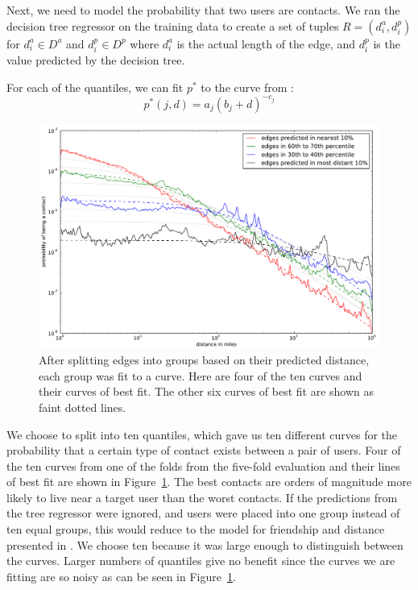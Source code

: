 \documentclass[letterpaper]{article}
\begin{document}
Next, we need to model the probability that two users are contacts. We ran the decision tree regressor on the training data to create a set of
tuples $R = (d^a_i, d^p_i)$ for $d^a_i \in D^a$ and $d^p_i \in D^p$ where $d^a_i$ is the actual length of the edge, and $d^p_i$ is the value predicted by the decision tree. 






For each of the quantiles, we can fit $p^*$ to the curve from \cite{backstrom2010find}:
\[
    p^*(j,d) = a_{j} (b_{j}+d)^{-c_{j}}
\]

\begin{figure}[tbh]
\centering
\includegraphics[width=\linewidth]{figures/vect_fit.pdf}
\caption{
After splitting edges into groups based on their predicted distance, each group
was fit to a curve. Here are four of the ten curves and their curves of best
fit. The other six curves of best fit are shown as faint dotted lines.}
\label{fig:NearProbFit}
\end{figure}

We choose to split into ten quantiles, which gave us ten different curves for the probability that a certain type of contact exists between a pair of users.  Four of the ten curves from one of the folds from the five-fold evaluation and their lines of best fit are shown in Figure~\ref{fig:NearProbFit}. The best contacts are orders of magnitude more likely to live near a target user than the worst contacts. If the predictions from the tree regressor were ignored, and users were placed into one group instead of ten equal groups, this would reduce to the model for friendship and distance presented in \cite{backstrom2010find}. We choose ten because it was large enough to distinguish between the curves.  Larger numbers of quantiles give no benefit since the curves we are fitting are so noisy as can be seen in Figure~\ref{fig:NearProbFit}.
\end{document}

